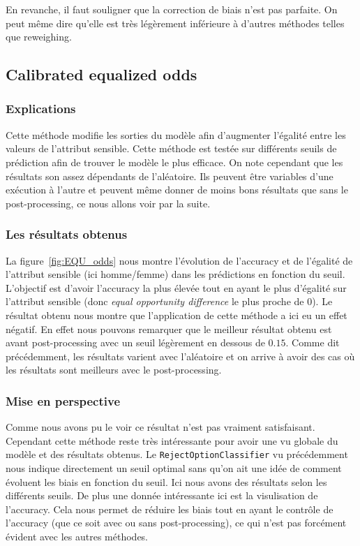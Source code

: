 \documentclass{article}
\begin{document}
    En revanche, il faut souligner que la correction de biais n'est pas parfaite. On peut même dire qu'elle est très légèrement inférieure à d'autres méthodes telles que reweighing.
    
    \subsection{Calibrated equalized odds}
    \subsubsection{Explications}
    Cette méthode modifie les sorties du modèle afin d'augmenter l'égalité entre les valeurs de l'attribut 
    sensible. Cette méthode est testée sur différents seuils de prédiction afin de trouver le modèle le plus efficace.
    On note cependant que les résultats son assez dépendants de l'aléatoire. Ils 
    peuvent être variables d'une exécution à l'autre et peuvent même donner de moins bons résultats que sans le 
    post-processing, ce nous allons voir par la suite.

    \subsubsection{Les résultats obtenus}
    La figure~\ref{fig:EQU_odds} nous montre l'évolution de l'accuracy et de l'égalité de l'attribut sensible 
    (ici homme/femme) dans les prédictions en fonction du seuil. L'objectif est d'avoir l'accuracy la plus élevée tout 
    en ayant le plus d'égalité sur l'attribut sensible (donc \textit{equal opportunity difference} le plus proche de 0).
    Le résultat obtenu nous montre que l'application de cette méthode a ici eu un effet négatif. En effet nous pouvons 
    remarquer que le meilleur résultat obtenu est avant post-processing avec un seuil légèrement en dessous de $0.15$.
    Comme dit précédemment, les résultats varient avec l'aléatoire et on arrive à avoir des cas où les résultats sont 
    meilleurs avec le post-processing.

    

    \subsubsection{Mise en perspective}
    Comme nous avons pu le voir ce résultat n'est pas vraiment satisfaisant. Cependant cette méthode reste très
    intéressante pour avoir une vu globale du modèle et des résultats obtenus.
    Le \texttt{RejectOptionClassifier} vu précédemment nous indique directement un seuil optimal sans qu'on ait 
    une idée de comment évoluent les biais en fonction du seuil. Ici nous avons des résultats selon les 
    différents seuils. De plus une donnée intéressante ici est la visulisation de l'accuracy. Cela 
    nous permet de réduire les biais tout en ayant le contrôle de l'accuracy (que ce soit avec ou sans 
    post-processing), ce qui n'est pas forcément évident avec les autres méthodes.
    
\end{document}
